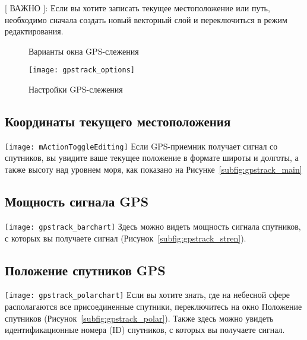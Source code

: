 [ ВАЖНО ]: Если вы хотите записать текущее местоположение или путь,
необходимо сначала создать новый векторный слой и переключиться в режим
редактирования.

\begin{figure}[ht]
\centering
     \hspace{0.33cm}
     \hspace{0.33cm}
\caption{Варианты окна GPS-слежения \nixcaption} \label{fig:gpstrack_live}
\end{figure}

\begin{figure}[ht]
   \centering
   \texttt{[image: gpstrack\_options]}
   \caption{Настройки GPS-слежения \nixcaption}
   \label{fig:gpstrack_options}
\end{figure}

\subsection{Координаты текущего местоположения}
\texttt{[image: mActionToggleEditing]} Если GPS-приемник
получает сигнал со спутников, вы увидите ваше текущее положение в формате широты
и долготы, а также высоту над уровнем моря, как показано на
Рисунке~\ref{subfig:gpstrack_main}

\subsection{Мощность сигнала GPS}
\texttt{[image: gpstrack\_barchart]} Здесь можно
видеть мощность сигнала спутников, с которых вы получаете сигнал
(Рисунок~\ref{subfig:gpstrack_stren}).

\subsection{Положение спутников GPS}
\texttt{[image: gpstrack\_polarchart]} Если вы
хотите знать, где на небесной сфере располагаются все присоединенные спутники,
переключитесь на окно Положение спутников
(Рисунок~\ref{subfig:gpstrack_polar}). Также здесь можно увидеть
идентификационные номера (ID) спутников, с которых вы получаете сигнал.

